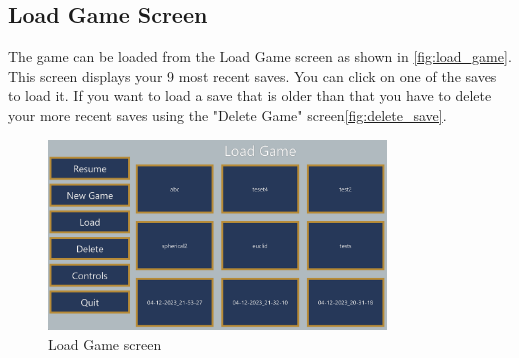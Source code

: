 \subsection{Load Game Screen}
The game can be loaded from the Load Game screen as shown in \autoref{fig:load_game}.
This screen displays your 9 most recent saves.
You can click on one of the saves to load it.
If you want to load a save that is older than that you have to delete your more recent saves using the "Delete Game" screen\ref*{fig:delete_save}. %

\begin{figure}[H]
    \centering
    \includegraphics[width=0.8\textwidth]{sections/user_manual/resources/load-game.png}
    \caption{Load Game screen}
    \label{fig:load_game}
\end{figure}